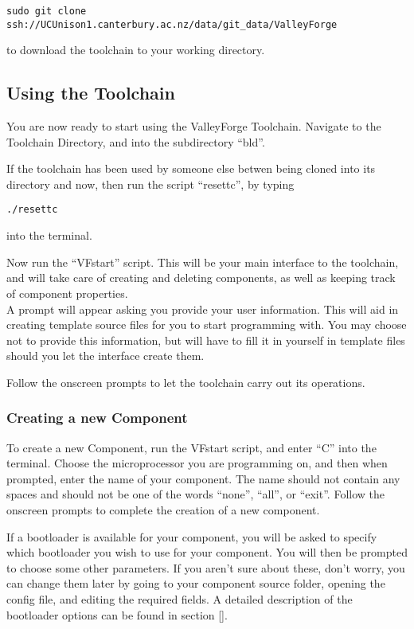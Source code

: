 \documentclass[a4paper, oneside, 11pt, titlepage, onecolumn, openright]{article}
\begin{document}
\begin{lstlisting}
sudo git clone ssh://UCUnison1.canterbury.ac.nz/data/git_data/ValleyForge
\end{lstlisting}
			to download the toolchain to your working directory.


	\subsection{Using the Toolchain }
			\label{ss:UsingTheToolchain}
			
			You are now ready to start using the ValleyForge Toolchain. Navigate to the Toolchain Directory, and into the subdirectory ``bld''. 

If the toolchain has been used by someone else betwen being cloned into its directory and now, then run the script ``resettc'', by typing
\begin{lstlisting}
./resettc
\end{lstlisting}
 into the terminal.
 
 			Now run the ``VFstart'' script. This will be your main interface to the toolchain, and will take care of creating and deleting components, as well as keeping track of component properties.\\
 A prompt will appear asking you provide your user information. This will aid in creating template source files for you to start programming with. You may choose not to provide this information, but will have to fill it in yourself in template files should you let the interface create them.
 
 Follow the onscreen prompts to let the toolchain carry out its operations.

		\subsubsection{Creating a new Component}
			\label{sss:Create New Component}
			
			To create a new Component, run the VFstart script, and enter ``C'' into the terminal. Choose the microprocessor you are programming on, and then when prompted, enter the name of your component. The name should not contain any spaces and should not be one of the words ``none'', ``all'', or ``exit''. Follow the onscreen prompts to complete the creation of a new component. 

If a bootloader is available for your component, you will be asked to specify which bootloader you wish to use for your component. You will then be prompted to choose some other parameters. If you aren't sure about these, don't worry, you can change them later by going to your component source folder, opening the config file, and editing the required fields. A detailed description of the bootloader options can be found in section [].
\end{document}
